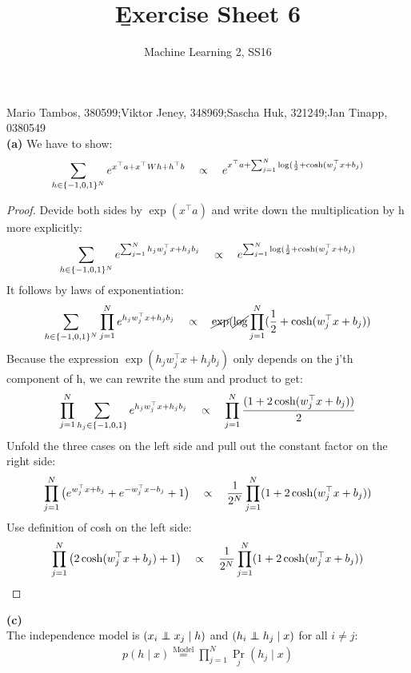 \documentclass[a4paper]{article}
\newcommand\indep{\protect\mathpalette{\protect\indeP}{\perp}}
\def\indeP#1#2{\mathrel{\rlap{$#1#2$}\mkern2mu{#1#2}}}
\newcommand{\hto}{{h^\top}}
\newcommand{\xt}{{x^\top}}
\newcommand{\1}{\mathds{1}}
\begin{document}
\title{\b{Exercise Sheet 6}}
\author{Machine Learning 2, SS16}

\maketitle

Mario Tambos, 380599;\quad Viktor Jeney, 348969;\quad Sascha Huk, 321249;\quad Jan Tinapp, 0380549\\


\textbf{(a)} We have to show:
\begin{gather*}
	\sum_{h\in\{-1,0,1\}^N} e^{\xt a + \xt Wh + \hto b }
	\quad \propto \quad
	e^{\xt a + \sum_{j=1}^N \log({1\over 2} + \cosh(w^\top_j x + b_j)}  
\end{gather*}
\begin{proof}
Devide both sides by $\exp(x^\top a)$ and write down the multiplication by h more explicitly:
\begin{gather*}
	\sum_{h\in\{-1,0,1\}^N} e^{\sum_{j=1}^N h_j w_j^\top x + h_j b_j }
	\quad \propto \quad
	e^{\sum_{j=1}^N \log({1\over 2} + \cosh(w^\top_j x + b_j)}  
\end{gather*}
It follows by laws of exponentiation: 
\begin{gather*}
	\sum_{h\in\{-1,0,1\}^N} \prod_{j=1}^N e^{ h_j w_j^\top x + h_j b_j }
	\quad \propto \quad
	\cancel{\exp}(\cancel{\log}\prod_{j=1}^N ({1\over 2} + \cosh(w^\top_j x + b_j))  
\end{gather*} 
Because the expression $\exp( h_j w_j^\top x + h_j b_j )$ only depends on the j'th component of h, 
we can rewrite the sum and product to get:
\begin{gather*}
	\prod_{j=1}^N \sum_{h_j\in\{-1,0,1\}} e^{ h_j w_j^\top x + h_j b_j }
	\quad \propto \quad
	\prod_{j=1}^N {(1 + 2\cosh(w^\top_j x + b_j) ) \over 2} 
\end{gather*}
Unfold the three cases on the left side and pull out the constant factor on the right side:
\begin{gather*}
	\prod_{j=1}^N \big( e^{w_j^\top x + b_j}  +  e^{-w_j^\top x - b_j}   +  1  \big)
	\quad \propto \quad
	{1 \over 2^N}\prod_{j=1}^N (1 + 2\cosh(w^\top_j x + b_j)  )
\end{gather*}
Use definition of cosh on the left side:
\begin{gather*}
	\prod_{j=1}^N \big( 2\cosh(w^\top_j x + b_j)   +  1  \big)
	\quad \propto \quad
	{1 \over 2^N}\prod_{j=1}^N (1 + 2\cosh(w^\top_j x + b_j)  )
\end{gather*}
\end{proof}
\newpage
\textbf{(c)} \\
The independence model is $(x_i \indep x_j \mid h)$ and $(h_i \indep h_j \mid x)$ for all $i\neq j$:   
\begin{gather*}
	p(h \mid x) \stackrel{\text{Model}}{=} \prod_{j=1}^N {\Pr}_j(h_j \mid x)  
\end{gather*}
\end{document}
